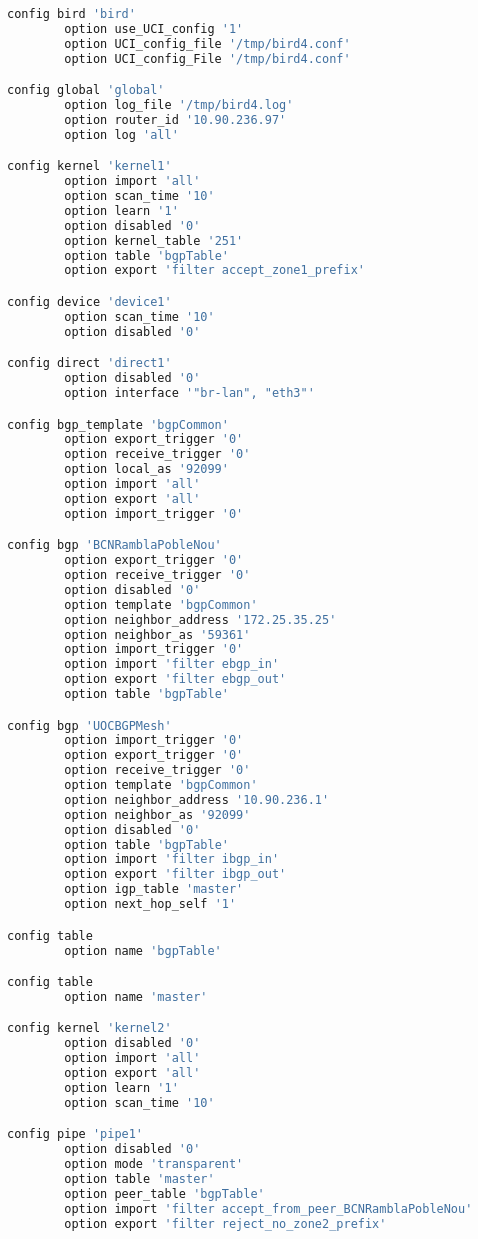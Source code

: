 \begin{lstlisting}[language=bash, caption={Bird UCI}]
config bird 'bird'
        option use_UCI_config '1'
        option UCI_config_file '/tmp/bird4.conf'
        option UCI_config_File '/tmp/bird4.conf'

config global 'global'
        option log_file '/tmp/bird4.log'
        option router_id '10.90.236.97'
        option log 'all'

config kernel 'kernel1'
        option import 'all'
        option scan_time '10'
        option learn '1'
        option disabled '0'
        option kernel_table '251'
        option table 'bgpTable'
        option export 'filter accept_zone1_prefix'

config device 'device1'
        option scan_time '10'
        option disabled '0'

config direct 'direct1'
        option disabled '0'
        option interface '"br-lan", "eth3"'

config bgp_template 'bgpCommon'
        option export_trigger '0'
        option receive_trigger '0'
        option local_as '92099'
        option import 'all'
        option export 'all'
        option import_trigger '0'

config bgp 'BCNRamblaPobleNou'
        option export_trigger '0'
        option receive_trigger '0'
        option disabled '0'
        option template 'bgpCommon'
        option neighbor_address '172.25.35.25'
        option neighbor_as '59361'
        option import_trigger '0'
        option import 'filter ebgp_in'
        option export 'filter ebgp_out'
        option table 'bgpTable'

config bgp 'UOCBGPMesh'
        option import_trigger '0'
        option export_trigger '0'
        option receive_trigger '0'
        option template 'bgpCommon'
        option neighbor_address '10.90.236.1'
        option neighbor_as '92099'
        option disabled '0'
        option table 'bgpTable'
        option import 'filter ibgp_in'
        option export 'filter ibgp_out'
        option igp_table 'master'
        option next_hop_self '1'

config table
        option name 'bgpTable'

config table
        option name 'master'

config kernel 'kernel2'
        option disabled '0'
        option import 'all'
        option export 'all'
        option learn '1'
        option scan_time '10'

config pipe 'pipe1'
        option disabled '0'
        option mode 'transparent'
        option table 'master'
        option peer_table 'bgpTable'
        option import 'filter accept_from_peer_BCNRamblaPobleNou'
        option export 'filter reject_no_zone2_prefix'
\end{lstlisting}